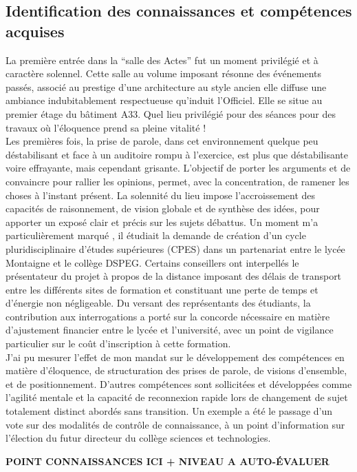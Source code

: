 \documentclass{article}
\begin{document}
\subsection{Identification des connaissances et compétences acquises}
La première entrée dans la ``salle des Actes'' fut un moment privilégié et à caractère solennel. Cette salle au volume imposant résonne des événements passés, associé au prestige d'une architecture au style ancien elle diffuse une ambiance indubitablement respectueuse qu'induit l'Officiel. Elle se situe au premier étage du bâtiment A33. Quel lieu privilégié pour des séances pour des travaux où l’éloquence prend sa pleine vitalité ! \\ Les premières fois, la prise de parole, dans cet environnement  quelque peu déstabilisant et face à un auditoire rompu à l'exercice, est plus que déstabilisante voire effrayante, mais cependant grisante. L'objectif de porter les arguments et de convaincre pour rallier les opinions, permet, avec la concentration, de ramener les choses à l'instant présent. La solennité du lieu impose l'accroissement des capacités de raisonnement, de vision globale et de synthèse des idées, pour apporter un exposé clair et précis sur les sujets débattus. Un moment m'a particulièrement marqué , il étudiait la demande de création d'un cycle pluridisciplinaire d'études supérieures (CPES) dans un partenariat entre le lycée Montaigne et le collège DSPEG. Certains conseillers ont interpellés le présentateur du projet à propos de la distance imposant des délais de transport entre les différents sites de formation et constituant une perte de temps et d'énergie non négligeable. Du versant des représentants des étudiants, la contribution aux interrogations a porté sur la concorde nécessaire en matière d'ajustement financier entre le lycée et l'université, avec un point de vigilance particulier sur le coût d'inscription à cette formation. \\

J'ai pu mesurer l'effet de mon mandat sur le développement des compétences en matière d'éloquence, de structuration des prises de parole, de visions d'ensemble, et de positionnement. D'autres compétences sont sollicitées et développées comme l'agilité mentale et la capacité de reconnexion rapide lors de changement de sujet totalement distinct abordés sans transition. Un exemple a été le passage d'un vote sur des modalités de contrôle de connaissance, à un point d'information sur l'élection du futur directeur du collège sciences et technologies. \par
\textbf{POINT CONNAISSANCES ICI + NIVEAU A AUTO-ÉVALUER}
\end{document}
